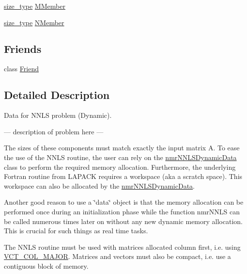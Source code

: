 {\bf }\par
\begin{DoxyCompactItemize}
\item 
\hyperlink{classnmr_n_n_l_s_dynamic_data_aff3aaadfea66b14eac2e3e022e41b35b}{size\+\_\+type} \hyperlink{classnmr_n_n_l_s_dynamic_data_a764d62f5392d4ef010be7bf8b3fbcc4e}{M\+Member}
\item 
\hyperlink{classnmr_n_n_l_s_dynamic_data_aff3aaadfea66b14eac2e3e022e41b35b}{size\+\_\+type} \hyperlink{classnmr_n_n_l_s_dynamic_data_ab6f716705212d11032677f958736a570}{N\+Member}
\end{DoxyCompactItemize}

\subsection*{Friends}
\begin{DoxyCompactItemize}
\item 
class \hyperlink{classnmr_n_n_l_s_dynamic_data_a7f8321d57e81bc613d5dbef3410ba70e}{Friend}
\end{DoxyCompactItemize}


\subsection{Detailed Description}
Data for N\+N\+L\+S problem (Dynamic). 

--- description of problem here ---

The sizes of these components must match exactly the input matrix A. To ease the use of the N\+N\+L\+S routine, the user can rely on the \hyperlink{classnmr_n_n_l_s_dynamic_data}{nmr\+N\+N\+L\+S\+Dynamic\+Data} class to perform the required memory allocation. Furthermore, the underlying Fortran routine from L\+A\+P\+A\+C\+K requires a workspace (aka a scratch space). This workspace can also be allocated by the \hyperlink{classnmr_n_n_l_s_dynamic_data}{nmr\+N\+N\+L\+S\+Dynamic\+Data}.

Another good reason to use a \char`\"{}data\char`\"{} object is that the memory allocation can be performed once during an initialization phase while the function nmr\+N\+N\+L\+S can be called numerous times later on without any new dynamic memory allocation. This is crucial for such things as real time tasks.

The N\+N\+L\+S routine must be used with matrices allocated column first, i.\+e. using \hyperlink{vct_forward_declarations_8h_a432cdf8923afaf82f551450ad4034746}{V\+C\+T\+\_\+\+C\+O\+L\+\_\+\+M\+A\+J\+O\+R}. Matrices and vectors must also be compact, i.\+e. use a contiguous block of memory.

